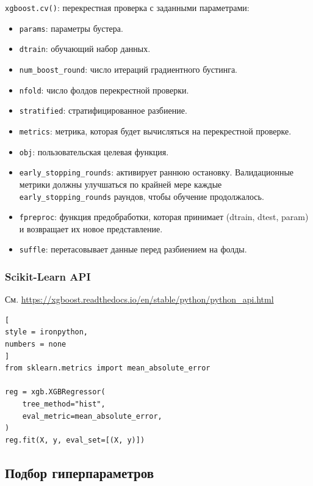 \documentclass[%
	11pt,
	a4paper,
	utf8,
		]{article}
\begin{document}
\verb|xgboost.cv()|: перекрестная проверка с заданными параметрами:
\begin{itemize}
	\item \verb|params|: параметры бустера.
	
	\item \verb|dtrain|: обучающий набор данных.
	
	\item \verb|num_boost_round|: число итераций градиентного бустинга.
	
	\item \verb|nfold|: число фолдов перекрестной проверки.
	
	\item \verb|stratified|: стратифицированное разбиение.
	
	\item \verb|metrics|: метрика, которая будет вычисляться на перекрестной проверке.
	
	\item \verb|obj|: пользовательская целевая функция.
	
	\item \verb|early_stopping_rounds|: активирует раннюю остановку. Валидационные метрики должны улучшаться по крайней мере каждые \verb|early_stopping_rounds| раундов, чтобы обучение продолжалось. 
	
	\item \verb|fpreproc|: функция предобработки, которая принимает (dtrain, dtest, param) и возвращает их новое представление.
	
	\item \verb|suffle|: перетасовывает данные перед разбиением на фолды.
\end{itemize}

\subsubsection{Scikit-Learn API}

См. \url{https://xgboost.readthedocs.io/en/stable/python/python_api.html}

\begin{lstlisting}[
style = ironpython,
numbers = none
]
from sklearn.metrics import mean_absolute_error

reg = xgb.XGBRegressor(
    tree_method="hist",
    eval_metric=mean_absolute_error,
)
reg.fit(X, y, eval_set=[(X, y)])
\end{lstlisting}

\subsection{Подбор гиперпараметров}
\end{document}
